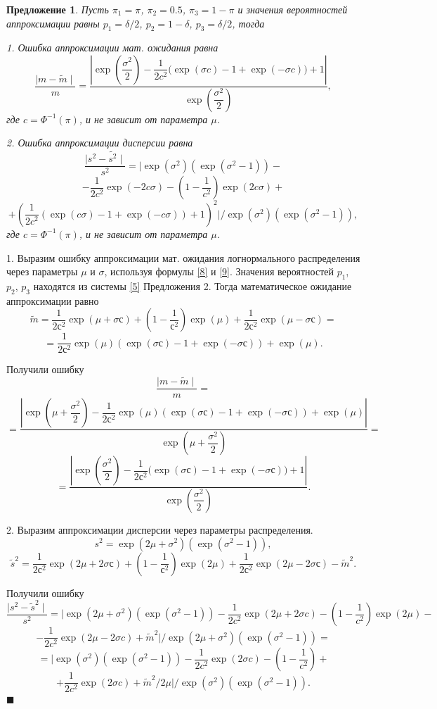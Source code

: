 \documentclass[12pt]{article}
\newtheorem{proposition}[theorem]{Предложение}
\newenvironment{Proof}{\par\noindent{\bf Доказательство.}}{\hfill$\scriptstyle\blacksquare$}
\begin{document}
	\begin{proposition}\label{pr7}
		Пусть $\pi_{1} = \pi$, $\pi_{2} = 0.5$, $\pi_{3} = 1-\pi$ и значения вероятностей аппроксимации равны $p_{1} = \delta/2$, $p_{2} = 1-\delta$, $p_{3} = \delta/2$, тогда
		
		1. Ошибка аппроксимации мат. ожидания равна
		\[\dfrac{\mid m - \widetilde{m} \mid}{m}  = \dfrac{\left|\exp\left(\dfrac{\sigma^{2}}{2}\right) - \dfrac{1}{2c^{2}}\bigg(\exp(\sigma c)-1 +\exp(-\sigma c)\bigg) + 1\right|}{\exp\left(\dfrac{\sigma^{2}}{2}\right)},\]
		где $c = \Phi^{-1}(\pi)$, и не зависит от параметра $\mu$.
		
		2. Ошибка аппроксимации дисперсии равна
		\[\dfrac{\mid s^{2} - \widetilde{s^{2}} \mid}{s^{2}} = \biggl|\exp(\sigma^{2})(\exp(\sigma^{2}-1)) -\]\[- \dfrac{1}{2c^{2}}\exp(-2c\sigma)- \left( 1- \dfrac{1}{c^{2}}\right) \exp(2c\sigma)+\]\[+ \left( \dfrac{1}{2c^{2}}(\exp(c\sigma)-1+\exp(-c\sigma)) + 1\right) ^{2}\biggr| /\exp(\sigma^{2})(\exp(\sigma^{2}-1)),\]
		где $c = \Phi^{-1}(\pi)$, и не зависит от параметра $\mu$.
		
	\end{proposition}
	\begin{Proof}
		1. Выразим ошибку аппроксимации мат. ожидания логнормального распределения через параметры $\mu$ и $\sigma$, используя формулы \eqref{8} и \eqref{9}. Значения вероятностей $p_{1}$, $p_{2}$, $p_{3}$ находятся из системы \eqref{5} Предложения 2. Тогда математическое ожидание аппроксимации равно
		\[\tilde{m} = \dfrac{1}{2с^{2}}\exp(\mu+\sigma с)+\left(1 - \dfrac{1}{с^{2}}\right)\exp(\mu)+ \dfrac{1}{2с^{2}}\exp(\mu-\sigma с)=\]
		\[= \dfrac{1}{2с^{2}} \exp(\mu)(\exp(\sigma с)-1+\exp(-\sigma с)) + \exp(\mu). \]
		
		Получили ошибку
		\[\dfrac{\mid m - \widetilde{m} \mid}{m} = \]\[=\dfrac{\left| \exp\left(\mu+\dfrac{\sigma^{2}}{2}\right) - \dfrac{1}{2с^{2}} \exp(\mu)(\exp(\sigma с)-1 +\exp(-\sigma с)) + \exp(\mu) \right|}{\exp\left(\mu+\dfrac{\sigma^{2}}{2}\right)}=\]
		\[=\dfrac{\left| \exp\left(\dfrac{\sigma^{2}}{2}\right) - \dfrac{1}{2с^{2}} \bigg(\exp(\sigma с)-1 +\exp(-\sigma с)\bigg) + 1 \right|}{\exp\left(\dfrac{\sigma^{2}}{2}\right)}.\]
		
		2. Выразим аппроксимации дисперсии через параметры распределения.
		\[s^{2} = \exp(2\mu+\sigma^{2})(\exp(\sigma^{2}-1)),\]
		\[\tilde{s}^{2} = \dfrac{1}{2с^{2}}\exp(2\mu+2\sigma с)+\left(1 - \dfrac{1}{с^{2}}\right)\exp(2\mu)+ \dfrac{1}{2с^{2}}\exp(2\mu-2\sigma с) - \tilde{m}^{2}.\]
		
		Получили ошибку
		\[\dfrac{\mid s^{2} - \widetilde{s}^{2} \mid}{s^{2}} = \biggl| \exp(2\mu+\sigma^{2})(\exp(\sigma^{2}-1)) - \dfrac{1}{2c^{2}}\exp(2\mu+2\sigma c)- \left(1 - \dfrac{1}{c^{2}}\right)\exp(2\mu)-\]
		\[-\dfrac{1}{2c^{2}}\exp(2\mu-2\sigma c) + \tilde{ m}^{2}\biggr|/\exp(2\mu+\sigma^{2})(\exp(\sigma^{2}-1))=\]
		\[=\biggl| \exp(\sigma^{2})(\exp(\sigma^{2}-1)) - \dfrac{1}{2c^{2}}\exp(2\sigma c)- \left(1 - \dfrac{1}{c^{2}}\right)+\]
		\[+\dfrac{1}{2c^{2}}\exp(2\sigma c) + \tilde{ m}^{2}/2\mu\biggr|/\exp(\sigma^{2})(\exp(\sigma^{2}-1)).\]
	\end{Proof}
\end{document}
